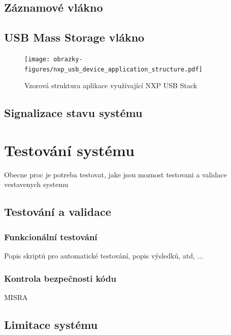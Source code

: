 \section{Záznamové vlákno}

\section{USB Mass Storage vlákno}

\begin{figure}[h]
    \centering
    \texttt{[image: obrazky-figures/nxp\_usb\_device\_application\_structure.pdf]}
    
    \caption{Vzorová struktura aplikace využívající NXP USB Stack \cite{silicon_labs_mass_storage_protocol}}
    \label{fig:usb-device-app-structure}
\end{figure}


\section{Signalizace stavu systému}

\chapter{Testování systému}
Obecne proc je potreba testovat, jake jsou moznost testovani a validace vestavenych systemu


\section{Testování a validace}

\subsection{Funkcionální testování}
Popis skriptů pro automatické testování, popis výsledků, atd, ...

\subsection{Kontrola bezpečnosti kódu}
MISRA


\section{Limitace systému}
\label{limitace}


